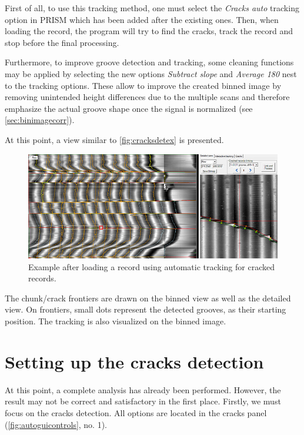 First of all, to use this tracking method, one must select the \emph{Cracks auto} tracking option in PRISM which has been added after the existing ones. Then, when loading the record, the program will try to find the cracks, track the record and stop before the final processing.

Furthermore, to improve groove detection and tracking, some cleaning functions may be applied by selecting the new options \emph{Subtract slope} and \emph{Average 180} nest to the tracking options. These allow to improve the created binned image by removing unintended height differences due to the multiple scans and therefore emphasize the actual groove shape once the signal is normalized (see \autoref{sec:binimagecorr}).

At this point, a view similar to \autoref{fig:cracksdetex} is presented.

\begin{figure}[!ht]
\centering
\includegraphics[width=1.0\textwidth]{images/cracks-det-ex}
\caption{Example after loading a record using automatic tracking for cracked records.}
\label{fig:cracksdetex}
\end{figure}

The chunk/crack frontiers are drawn on the binned view as well as the detailed view. On frontiers, small dots represent the detected grooves, as their starting position. The tracking is also visualized on the binned image.

\section{Setting up the cracks detection}

At this point, a complete analysis has already been performed. However, the result may not be correct and satisfactory in the first place. Firstly, we must focus on the cracks detection. All options are located in the cracks panel (\autoref{fig:autoguicontrols}, no. 1).

